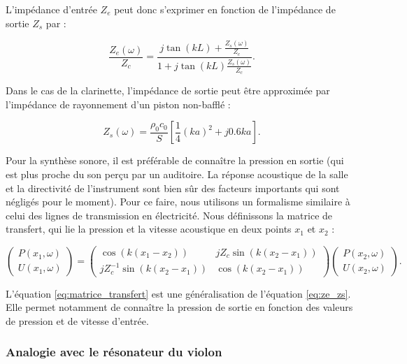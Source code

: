\documentclass[atiam, article]{rapport} %
\begin{document}
L'impédance d'entrée $Z_e$ peut donc s'exprimer en fonction de l'impédance de sortie $Z_s$ par :

\begin{equation}
    \frac{Z_e(\omega)}{Z_c}=\frac{j\tan(kL)+\frac{Z_s(\omega)}{Z_c}}{1+j\tan(kL)\frac{Z_s(\omega)}{Z_c}}.
\label{eq:ze_zs}
\end{equation}

Dans le cas de la clarinette, l'impédance de sortie peut être approximée par l'impédance de rayonnement d'un piston non-bafflé \cite{chaigne2008acoustique} :

\begin{equation}
    Z_s(\omega) = \frac{\rho_0c_0}{S}\left[\frac{1}{4}(ka)^2 + j0.6 ka\right].
\end{equation}

Pour la synthèse sonore, il est préférable de connaître la pression en sortie (qui est plus proche du son perçu par un auditoire. La réponse acoustique de la salle et la directivité de l'instrument sont bien sûr des facteurs importants qui sont négligés pour le moment). Pour ce faire, nous utilisons un formalisme similaire à celui des lignes de transmission en électricité. Nous définissons la matrice de transfert, qui lie la pression et la vitesse acoustique en deux points $x_1$ et $x_2$ :

\begin{equation}
    \begin{pmatrix}
        P(x_1,\omega)\\
        U(x_1,\omega) 
    \end{pmatrix}
    = \begin{pmatrix}
        \cos(k(x_1-x_2))&jZ_c\sin(k(x_2-x_1))\\
        jZ_c^{-1}\sin(k(x_2-x_1))&\cos(k(x_2-x_1))
    \end{pmatrix}
    \begin{pmatrix}
        P(x_2,\omega)\\
        U(x_2,\omega)
    \end{pmatrix}.
\label{eq:matrice_transfert}
\end{equation}

L'équation \ref{eq:matrice_transfert} est une généralisation de l'équation \ref{eq:ze_zs}. Elle permet notamment de connaître la pression de sortie en fonction des valeurs de pression et de vitesse d'entrée.


\subsubsection{Analogie avec le résonateur du violon}
\end{document}
